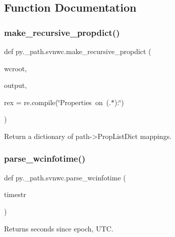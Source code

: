 \subsection{Function Documentation}
\mbox{\label{namespacepy_1_1__path_1_1svnwc_a43a80bcb7d8145c9557c91d0c4b59f10}} 
\subsubsection{\texorpdfstring{make\+\_\+recursive\+\_\+propdict()}{make\_recursive\_propdict()}}
{\footnotesize\ttfamily def py.\+\_\+path.\+svnwc.\+make\+\_\+recursive\+\_\+propdict (\begin{DoxyParamCaption}\item[{}]{wcroot,  }\item[{}]{output,  }\item[{}]{rex = {\ttfamily re.compile(\char`\"{}Properties~on~\textquotesingle{}(.$\ast$)\textquotesingle{}\+:\char`\"{})} }\end{DoxyParamCaption})}

\begin{DoxyVerb}Return a dictionary of path->PropListDict mappings. \end{DoxyVerb}
 \mbox{\label{namespacepy_1_1__path_1_1svnwc_aabe380627c4211192037554287b229c7}} 
\subsubsection{\texorpdfstring{parse\+\_\+wcinfotime()}{parse\_wcinfotime()}}
{\footnotesize\ttfamily def py.\+\_\+path.\+svnwc.\+parse\+\_\+wcinfotime (\begin{DoxyParamCaption}\item[{}]{timestr }\end{DoxyParamCaption})}

\begin{DoxyVerb}Returns seconds since epoch, UTC. \end{DoxyVerb}
 